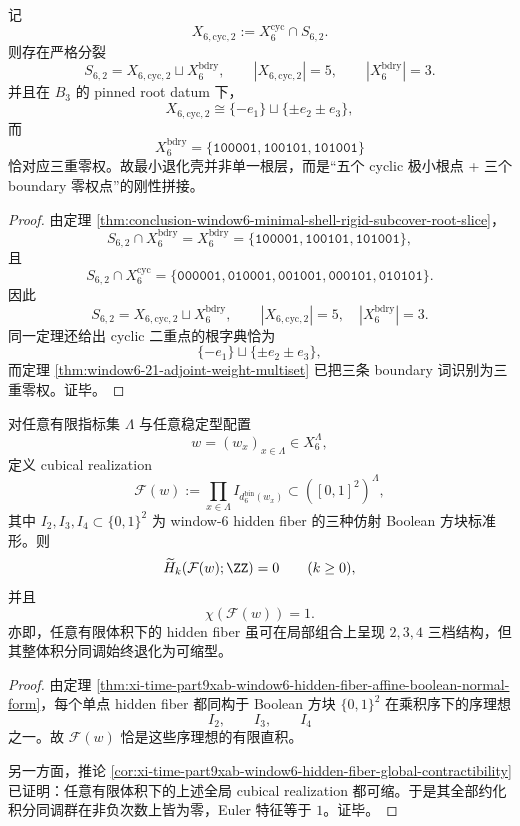 \begin{theorem}\label{thm:conclusion-window6-minimal-shell-five-three-cleavage}
记
\[
X_{6,\mathrm{cyc},2}:=X_6^{\mathrm{cyc}}\cap S_{6,2}.
\]
则存在严格分裂
\[
S_{6,2}=X_{6,\mathrm{cyc},2}\sqcup X_6^{\mathrm{bdry}},
\qquad
|X_{6,\mathrm{cyc},2}|=5,
\qquad
|X_6^{\mathrm{bdry}}|=3.
\]
并且在 \(B_3\) 的 pinned root datum 下，
\[
X_{6,\mathrm{cyc},2}\cong \{-e_1\}\sqcup\{\pm e_2\pm e_3\},
\]
而
\[
X_6^{\mathrm{bdry}}=\{\texttt{100001},\texttt{100101},\texttt{101001}\}
\]
恰对应三重零权。故最小退化壳并非单一根层，而是“五个 cyclic 极小根点 + 三个 boundary 零权点”的刚性拼接。
\end{theorem}
\begin{proof}
由定理 \ref{thm:conclusion-window6-minimal-shell-rigid-subcover-root-slice}，
\[
S_{6,2}\cap X_6^{\mathrm{bdry}}
=
X_6^{\mathrm{bdry}}
=
\{\texttt{100001},\texttt{100101},\texttt{101001}\},
\]
且
\[
S_{6,2}\cap X_6^{\mathrm{cyc}}
=
\{\texttt{000001},\texttt{010001},\texttt{001001},\texttt{000101},\texttt{010101}\}.
\]
因此
\[
S_{6,2}=X_{6,\mathrm{cyc},2}\sqcup X_6^{\mathrm{bdry}},
\qquad
|X_{6,\mathrm{cyc},2}|=5,\quad |X_6^{\mathrm{bdry}}|=3.
\]
同一定理还给出 cyclic 二重点的根字典恰为
\[
\{-e_1\}\sqcup\{\pm e_2\pm e_3\},
\]
而定理 \ref{thm:window6-21-adjoint-weight-multiset} 已把三条 boundary 词识别为三重零权。证毕。
\end{proof}

\begin{theorem}\label{thm:conclusion-window6-hiddenfiber-integral-homology-triviality}
对任意有限指标集 \(\Lambda\) 与任意稳定型配置
\[
w=(w_x)_{x\in \Lambda}\in X_6^\Lambda,
\]
定义 cubical realization
\[
\mathcal F(w):=\prod_{x\in\Lambda} I_{d_6^{\mathrm{bin}}(w_x)}
\subset ([0,1]^2)^\Lambda,
\]
其中 \(I_2,I_3,I_4\subset \{0,1\}^2\) 为 window-\(6\) hidden fiber 的三种仿射 Boolean 方块标准形。则
\[
\widetilde H_k(\mathcal F(w);\ZZ)=0
\qquad (k\ge 0),
\]
并且
\[
\chi(\mathcal F(w))=1.
\]
亦即，任意有限体积下的 hidden fiber 虽可在局部组合上呈现 \(2,3,4\) 三档结构，但其整体积分同调始终退化为可缩型。
\end{theorem}
\begin{proof}
由定理 \ref{thm:xi-time-part9xab-window6-hidden-fiber-affine-boolean-normal-form}，每个单点 hidden fiber 都同构于 Boolean 方块 \(\{0,1\}^2\) 在乘积序下的序理想
\[
I_2,\qquad I_3,\qquad I_4
\]
之一。故 \(\mathcal F(w)\) 恰是这些序理想的有限直积。

另一方面，推论 \ref{cor:xi-time-part9xab-window6-hidden-fiber-global-contractibility} 已证明：任意有限体积下的上述全局 cubical realization 都可缩。于是其全部约化积分同调群在非负次数上皆为零，Euler 特征等于 \(1\)。证毕。
\end{proof}

